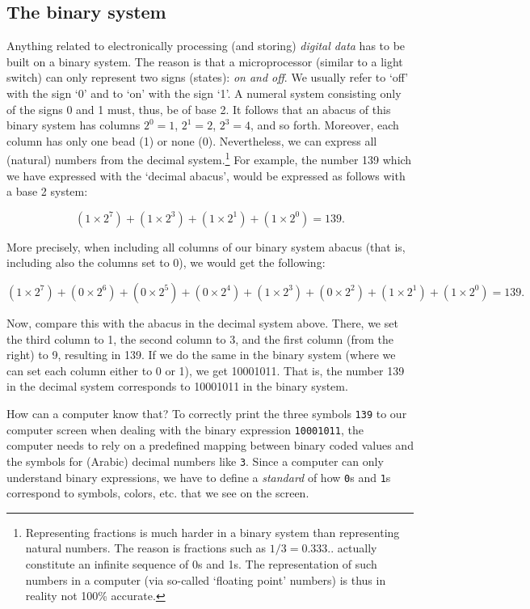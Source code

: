 \documentclass[
  12pt,
]{style/krantz}
\begin{document}
\hypertarget{the-binary-system}{%
\subsection{The binary system}\label{the-binary-system}}

Anything related to electronically processing (and storing) \emph{digital data} has to be built on a binary system. The reason is that a microprocessor (similar to a light switch) can only represent two signs (states): \emph{on and off}. We usually refer to `off' with the sign `0' and to `on' with the sign `1'. A numeral system consisting only of the signs 0 and 1 must, thus, be of base 2. It follows that an abacus of this binary system has columns \(2^0=1\), \(2^1=2\), \(2^3=4\), and so forth. Moreover, each column has only one bead (1) or none (0). Nevertheless, we can express all (natural) numbers from the decimal system.\footnote{Representing fractions is much harder in a binary system than representing natural numbers. The reason is fractions such as \(1/3=0.333..\) actually constitute an infinite sequence of 0s and 1s. The representation of such numbers in a computer (via so-called `floating point' numbers) is thus in reality not 100\% accurate.} For example, the number 139 which we have expressed with the `decimal abacus', would be expressed as follows with a base 2 system:

\[(1 \times 2^7) + (1 \times 2^3) + (1 \times 2^1) + (1 \times 2^0) = 139.\]

More precisely, when including all columns of our binary system abacus (that is, including also the columns set to 0), we would get the following:

\[(1 \times 2^7) + (0 \times 2^6) +  (0 \times 2^5) +  (0 \times 2^4) + (1 \times 2^3) + (0 \times 2^2) + (1 \times 2^1) +  (1 \times 2^0)  = 139.\]

Now, compare this with the abacus in the decimal system above. There, we set the third column to 1, the second column to 3, and the first column (from the right) to 9, resulting in 139. If we do the same in the binary system (where we can set each column either to 0 or 1), we get 10001011. That is, the number 139 in the decimal system corresponds to 10001011 in the binary system.

How can a computer know that? To correctly print the three symbols \texttt{139} to our computer screen when dealing with the binary expression \texttt{10001011}, the computer needs to rely on a predefined mapping between binary coded values and the symbols for (Arabic) decimal numbers like \texttt{3}. Since a computer can only understand binary expressions, we have to define a \emph{standard} of how \texttt{0}s and \texttt{1}s correspond to symbols, colors, etc. that we see on the screen.
\end{document}
